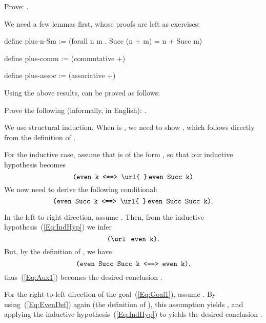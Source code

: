 \begin{exercise}[subtitle={\mbox{\rm{\em (SF Exercise 1.0.1, p. 28)}}}]
Prove: .
\end{exercise}
\begin{solution}
We need a few lemmas first, whose proofs are left as exercises:
\begin{tcAthena}
define plus-n-Sm := (forall n m . Succ (n + m) = n + Succ m)

define plus-comm := (commutative +)

define plus-assoc := (associative +)
\end{tcAthena}
Using the above results,  can be proved as follows:
\begin{tcAthena}

\end{tcAthena}
\end{solution}
\clearpage
\begin{exercise}
Prove the following (informally, in English): . 
\end{exercise}

\begin{solution}[print=true]
We use structural induction. When  is , we need to show , which follows
directly from the definition of . 

For the inductive case, assume that  is of the form , so that our inductive hypothesis becomes
\begin{equation}
\mtt{(even k <==> \url{~}$\ls$even Succ k)}
\label{Eq:IndHyp}
\end{equation}
We now need to derive the following conditional:
\begin{equation}
\mtt{(even Succ k <==> \url{~}$\ls$even Succ Succ k)}. 
\label{Eq:Goal1}
\end{equation}

In the left-to-right direction, assume . Then, from the inductive hypothesis~(\ref{Eq:IndHyp})
we infer 
\begin{equation}
\mtt{(\tneg even k)}.
\label{Eq:Aux1}
\end{equation}
But, by the definition of , we have 
\begin{equation}
\mtt{(even Succ Succ k <==> even k)},
\label{Eq:EvenDef}
\end{equation}
thus~(\ref{Eq:Aux1}) becomes the desired conclusion .

For the right-to-left direction of the goal~(\ref{Eq:Goal1}), assume . 
By using~(\ref{Eq:EvenDef}) again (the definition of ), this assumption yields 
, and applying the inductive hypothesis~(\ref{Eq:IndHyp}) to 
 yields the desired conclusion . 
\end{solution}

